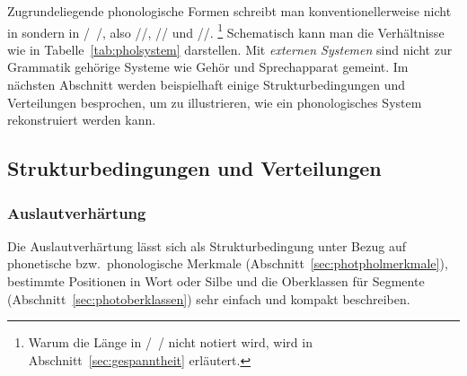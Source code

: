 \begin{table}
  \caption{Lexikon, Phonologie und Phonetik}
  \label{tab:pholsystem}
\end{table}

Zugrundeliegende phonologische Formen schreibt man konventionellerweise nicht in \textipa{[~]} sondern in /~/, also \zB //, // und //.%
\footnote{Warum die Länge in /~/ nicht notiert wird, wird in Abschnitt~\ref{sec:gespanntheit} erläutert.}
Schematisch kann man die Verhältnisse wie in Tabelle~\ref{tab:pholsystem} darstellen.
Mit \textit{externen Systemen} sind nicht zur Grammatik gehörige Systeme wie Gehör und Sprechapparat gemeint.
Im nächsten Abschnitt werden beispielhaft einige Strukturbedingungen und Verteilungen besprochen, um zu illustrieren, wie ein phonologisches System rekonstruiert werden kann.

\subsection{Strukturbedingungen und Verteilungen}

\subsubsection{Auslautverhärtung}

\label{sec:prozauslautverh}

Die Auslautverhärtung lässt sich als Strukturbedingung unter Bezug auf phonetische bzw.\ phonologische Merkmale (Abschnitt~\ref{sec:photpholmerkmale}), bestimmte Positionen in Wort oder Silbe und die Oberklassen für Segmente (Abschnitt~\ref{sec:photoberklassen}) sehr einfach und kompakt beschreiben.


